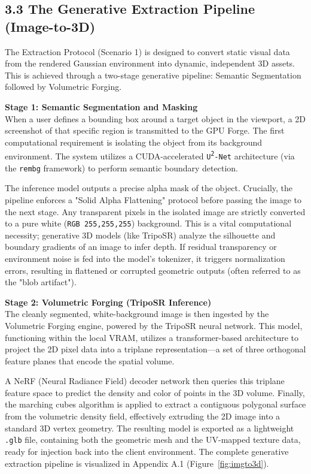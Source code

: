 \vspace{0.3cm}
\subsection*{3.3 The Generative Extraction Pipeline (Image-to-3D)}
The Extraction Protocol (Scenario 1) is designed to convert static visual data from the rendered Gaussian environment into dynamic, independent 3D assets. This is achieved through a two-stage generative pipeline: Semantic Segmentation followed by Volumetric Forging.

\vspace{0.2cm}
\textbf{Stage 1: Semantic Segmentation and Masking} \\
When a user defines a bounding box around a target object in the viewport, a 2D screenshot of that specific region is transmitted to the GPU Forge. The first computational requirement is isolating the object from its background environment. The system utilizes a CUDA-accelerated \texttt{U\textsuperscript{2}-Net} architecture (via the \texttt{rembg} framework) to perform semantic boundary detection. 

The inference model outputs a precise alpha mask of the object. Crucially, the pipeline enforces a "Solid Alpha Flattening" protocol before passing the image to the next stage. Any transparent pixels in the isolated image are strictly converted to a pure white (\texttt{RGB 255,255,255}) background. This is a vital computational necessity; generative 3D models (like TripoSR) analyze the silhouette and boundary gradients of an image to infer depth. If residual transparency or environment noise is fed into the model's tokenizer, it triggers normalization errors, resulting in flattened or corrupted geometric outputs (often referred to as the "blob artifact"). 

\vspace{0.2cm}
\textbf{Stage 2: Volumetric Forging (TripoSR Inference)} \\
The cleanly segmented, white-background image is then ingested by the Volumetric Forging engine, powered by the TripoSR neural network. This model, functioning within the local VRAM, utilizes a transformer-based architecture to project the 2D pixel data into a triplane representation—a set of three orthogonal feature planes that encode the spatial volume.

A NeRF (Neural Radiance Field) decoder network then queries this triplane feature space to predict the density and color of points in the 3D volume. Finally, the marching cubes algorithm is applied to extract a contiguous polygonal surface from the volumetric density field, effectively extruding the 2D image into a standard 3D vertex geometry. The resulting model is exported as a lightweight \texttt{.glb} file, containing both the geometric mesh and the UV-mapped texture data, ready for injection back into the client environment. The complete generative extraction pipeline is visualized in Appendix A.1 (Figure~\ref{fig:imgto3d}).


